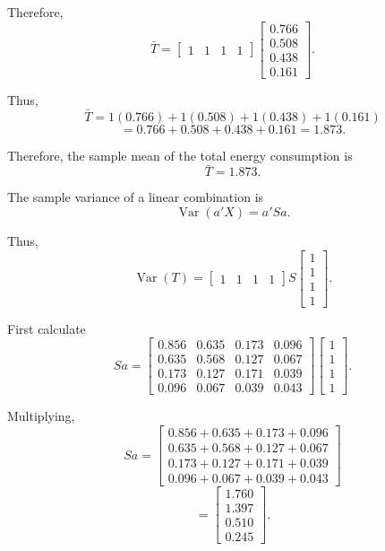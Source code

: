 \documentclass[12pt]{article}
\begin{document}
	Therefore,
	\[
	\bar{T}
	=
	\begin{bmatrix}
		1&1&1&1
	\end{bmatrix}
	\begin{bmatrix}
		0.766\\
		0.508\\
		0.438\\
		0.161
	\end{bmatrix}.
	\]
	
	Thus,
	\[
	\bar{T}
	=
	1(0.766)+1(0.508)+1(0.438)+1(0.161)
	\]
	\[
	=
	0.766+0.508+0.438+0.161
	=
	\boxed{1.873}.
	\]
	
	Therefore, the sample mean of the total energy consumption
	is
	\[
	\boxed{\bar{T}=1.873}.
	\]
	
	The sample variance of a linear combination is
	\[
	\operatorname{Var}(a'X)=a'Sa.
	\]
	
	Thus,
	\[
	\operatorname{Var}(T)
	=
	\begin{bmatrix}
		1&1&1&1
	\end{bmatrix}
	S
	\begin{bmatrix}
		1\\1\\1\\1
	\end{bmatrix}.
	\]
	
	First calculate
	\[
	Sa
	=
	\begin{bmatrix}
		0.856&0.635&0.173&0.096\\
		0.635&0.568&0.127&0.067\\
		0.173&0.127&0.171&0.039\\
		0.096&0.067&0.039&0.043
	\end{bmatrix}
	\begin{bmatrix}
		1\\1\\1\\1
	\end{bmatrix}.
	\]
	
	Multiplying,
	\[
	Sa
	=
	\begin{bmatrix}
		0.856+0.635+0.173+0.096\\
		0.635+0.568+0.127+0.067\\
		0.173+0.127+0.171+0.039\\
		0.096+0.067+0.039+0.043
	\end{bmatrix}
	\]
	\[
	=
	\begin{bmatrix}
		1.760\\
		1.397\\
		0.510\\
		0.245
	\end{bmatrix}.
	\]
	
\end{document}
